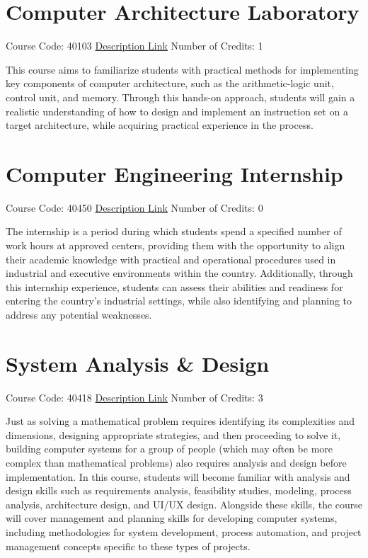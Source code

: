 \section{Computer Architecture Laboratory}
Course Code: 40103 \qquad \quad \href{https://docs.ce.sharif.edu/course/40103}{Description Link}
\qquad \quad Number of Credits: 1

This course aims to familiarize students with practical methods for implementing key components of computer architecture, such as the arithmetic-logic unit, control unit, and memory. Through this hands-on approach, students will gain a realistic understanding of how to design and implement an instruction set on a target architecture, while acquiring practical experience in the process.

\section{Computer Engineering Internship}
Course Code: 40450 \qquad \quad \href{https://docs.ce.sharif.edu/course/40450}{Description Link}
\qquad \quad Number of Credits: 0

The internship is a period during which students spend a specified number of work hours at approved centers, providing them with the opportunity to align their academic knowledge with practical and operational procedures used in industrial and executive environments within the country. Additionally, through this internship experience, students can assess their abilities and readiness for entering the country's industrial settings, while also identifying and planning to address any potential weaknesses.

\section{System Analysis \& Design}
Course Code: 40418 \qquad \quad \href{https://docs.ce.sharif.edu/course/40418}{Description Link}
\qquad \quad Number of Credits: 3

Just as solving a mathematical problem requires identifying its complexities and dimensions, designing appropriate strategies, and then proceeding to solve it, building computer systems for a group of people (which may often be more complex than mathematical problems) also requires analysis and design before implementation. In this course, students will become familiar with analysis and design skills such as requirements analysis, feasibility studies, modeling, process analysis, architecture design, and UI/UX design. Alongside these skills, the course will cover management and planning skills for developing computer systems, including methodologies for system development, process automation, and project management concepts specific to these types of projects.

